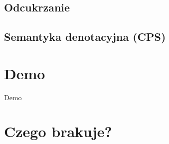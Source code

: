 \documentclass[12pt]{beamer}
\begin{document}
\subsection{Odcukrzanie}

\subsection{Semantyka denotacyjna (CPS)}

\section{Demo}

\begin{frame}
\begin{center}
   \LARGE{Demo}
\end{center}
\end{frame}

\section{Czego brakuje?}
\end{document}
